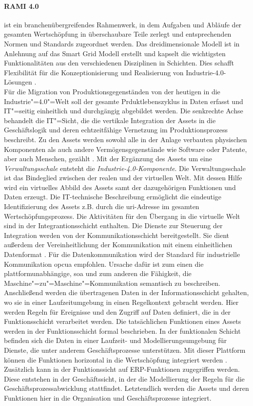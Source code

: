 \paragraph{RAMI 4.0} ist ein branchenübergreifendes Rahmenwerk, in dem Aufgaben und Abläufe der gesamten Wertschöpfung in überschaubare Teile zerlegt und entsprechenden Normen und Standards zugeordnet werden. Das dreidimensionale Modell ist in Anlehnung auf das Smart Grid Modell erstellt und kapselt die wichtigsten Funktionalitäten aus den verschiedenen Disziplinen in Schichten. Dies schafft Flexibilität für die Konzeptionisierung und Realisierung von Industrie-4.0-Lösungen \citep{Huebner2017}.
\\
Für die Migration von Produktionsgegenständen von der heutigen in die Industrie"=4.0"=Welt soll der gesamte Prduktlebenszyklus in Daten erfasst und IT"=seitig einheitlich und durchgängig abgebildet werden. Die senkrechte Achse behandelt die IT"=Sicht, die die vertikale Integration der Assets in die Geschäftslogik und deren echtzeitfähige Vernetzung im Produktionsprozess beschreibt. Zu den Assets werden sowohl alle in der Anlage verbauten physischen Komponenten als auch andere Vermögensgegenstände wie Software oder Patente, aber auch Menschen, gezählt \citep{Adolphs2017}. Mit der Ergänzung des Assets um eine \textit{Verwaltungsschale} entsteht die \textit{Industrie-4.0-Komponente}. Die Verwaltungsschale ist das Bindeglied zwischen der realen und der virtuellen Welt. Mit dessen Hilfe wird ein virtuelles Abbild des Assets samt der dazugehörigen Funktionen und Daten erzeugt. Die IT-technische Beschreibung ermöglicht die eindeutige Identifizierung des Assets z.B. durch die \ac{uri}-Adresse im gesamten Wertschöpfungsprozess. Die Aktivitäten für den Übergang in die virtuelle Welt sind in der Integrantionsschicht enthalten. Die Dienste zur Steuerung der Integration werden von der Kommunikationsschicht bereitgestellt. Sie dient außerdem der Vereinheitlichung der Kommunikation mit einem einheitlichen Datenformat \citep{BITKOM2015}. Für die Datenkommunikation wird der Standard für industrielle Kommunikation \ac{opcua} empfohlen. Ursache dafür ist zum einen die plattformunabhängige, \ac{soa} und zum anderen die Fähigkeit, die Maschine"=zu"=Maschine"=Kommunikation semantisch zu beschreiben.
Anschließend werden die übertragenen Daten in der Informationsschicht gehalten, wo sie in einer Laufzeitumgebung in einen Regelkontext gebracht werden. Hier werden Regeln für Ereignisse und den Zugriff auf Daten definiert, die in der Funktionsschicht verarbeitet werden. Die tatsächlichen Funktionen eines Assets werden in der Funktionsschicht formal beschrieben. In der funktionalen Schicht befinden sich die Daten in einer Laufzeit- und Modellierungsumgebung für Dienste, die unter anderem Geschäftsprozesse unterstützen. Mit dieser Plattform können die Funktionen horizontal in die Wertschöpfung integriert werden \citep{Huebner2017}. Zusätzlich kann in der Funktionssicht auf ERP-Funktionen zugegriffen werden. Diese entstehen in der Geschäftssicht, in der die Modellierung der Regeln für die Geschäftsprozessabwicklung stattfindet. Letztendlich werden die Assets und deren Funktionen hier in die Organisation und Geschäftsprozesse integriert.
